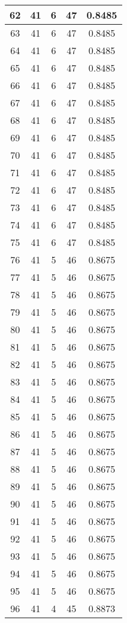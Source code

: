 \documentclass[letterpaper, 12pt]{article}
\begin{document}
\begin{longtable}{|c|c|c|c|c|}
\hline
62 & 41 & 6 & 47 & 0.8485 \\
\hline
63 & 41 & 6 & 47 & 0.8485 \\
\hline
64 & 41 & 6 & 47 & 0.8485 \\
\hline
65 & 41 & 6 & 47 & 0.8485 \\
\hline
66 & 41 & 6 & 47 & 0.8485 \\
\hline
67 & 41 & 6 & 47 & 0.8485 \\
\hline
68 & 41 & 6 & 47 & 0.8485 \\
\hline
69 & 41 & 6 & 47 & 0.8485 \\
\hline
70 & 41 & 6 & 47 & 0.8485 \\
\hline
71 & 41 & 6 & 47 & 0.8485 \\
\hline
72 & 41 & 6 & 47 & 0.8485 \\
\hline
73 & 41 & 6 & 47 & 0.8485 \\
\hline
74 & 41 & 6 & 47 & 0.8485 \\
\hline
75 & 41 & 6 & 47 & 0.8485 \\
\hline
76 & 41 & 5 & 46 & 0.8675 \\
\hline
77 & 41 & 5 & 46 & 0.8675 \\
\hline
78 & 41 & 5 & 46 & 0.8675 \\
\hline
79 & 41 & 5 & 46 & 0.8675 \\
\hline
80 & 41 & 5 & 46 & 0.8675 \\
\hline
81 & 41 & 5 & 46 & 0.8675 \\
\hline
82 & 41 & 5 & 46 & 0.8675 \\
\hline
83 & 41 & 5 & 46 & 0.8675 \\
\hline
84 & 41 & 5 & 46 & 0.8675 \\
\hline
85 & 41 & 5 & 46 & 0.8675 \\
\hline
86 & 41 & 5 & 46 & 0.8675 \\
\hline
87 & 41 & 5 & 46 & 0.8675 \\
\hline
88 & 41 & 5 & 46 & 0.8675 \\
\hline
89 & 41 & 5 & 46 & 0.8675 \\
\hline
90 & 41 & 5 & 46 & 0.8675 \\
\hline
91 & 41 & 5 & 46 & 0.8675 \\
\hline
92 & 41 & 5 & 46 & 0.8675 \\
\hline
93 & 41 & 5 & 46 & 0.8675 \\
\hline
94 & 41 & 5 & 46 & 0.8675 \\
\hline
95 & 41 & 5 & 46 & 0.8675 \\
\hline
96 & 41 & 4 & 45 & 0.8873 \\

\end{longtable}
\end{document}
